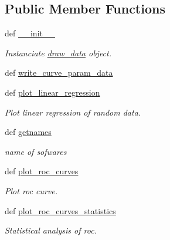 \subsection*{\-Public \-Member \-Functions}
\begin{DoxyCompactItemize}
\item 
\hypertarget{classMycarn__stat_1_1Draw__data_1_1draw__data_a437473a4abf5830bb67b09e3f3176ece}{
def \hyperlink{classMycarn__stat_1_1Draw__data_1_1draw__data_a437473a4abf5830bb67b09e3f3176ece}{\-\_\-\-\_\-init\-\_\-\-\_\-}}
\label{classMycarn__stat_1_1Draw__data_1_1draw__data_a437473a4abf5830bb67b09e3f3176ece}

\begin{DoxyCompactList}\small\item\em \-Instanciate \hyperlink{classMycarn__stat_1_1Draw__data_1_1draw__data}{draw\-\_\-data} object. \end{DoxyCompactList}\item 
def \hyperlink{classMycarn__stat_1_1Draw__data_1_1draw__data_a9edfe96dfef77f62ca98c3881cfa275b}{write\-\_\-curve\-\_\-param\-\_\-data}
\item 
def \hyperlink{classMycarn__stat_1_1Draw__data_1_1draw__data_a22b2c3a853f953041168eb83b12a3323}{plot\-\_\-linear\-\_\-regression}
\begin{DoxyCompactList}\small\item\em \-Plot linear regression of random data. \end{DoxyCompactList}\item 
def \hyperlink{classMycarn__stat_1_1Draw__data_1_1draw__data_a9d6715be9adf56697cb263f9e119bc8b}{getnames}
\begin{DoxyCompactList}\small\item\em name of sofwares \end{DoxyCompactList}\item 
def \hyperlink{classMycarn__stat_1_1Draw__data_1_1draw__data_a8fb21930340537bde569dcb07e6e1bd0}{plot\-\_\-roc\-\_\-curves}
\begin{DoxyCompactList}\small\item\em \-Plot roc curve. \end{DoxyCompactList}\item 
def \hyperlink{classMycarn__stat_1_1Draw__data_1_1draw__data_a01971cfd0aa624df8dad48d90362e772}{plot\-\_\-roc\-\_\-curves\-\_\-statistics}
\begin{DoxyCompactList}\small\item\em \-Statistical analysis of roc. \end{DoxyCompactList}\item 

\end{DoxyCompactItemize}

